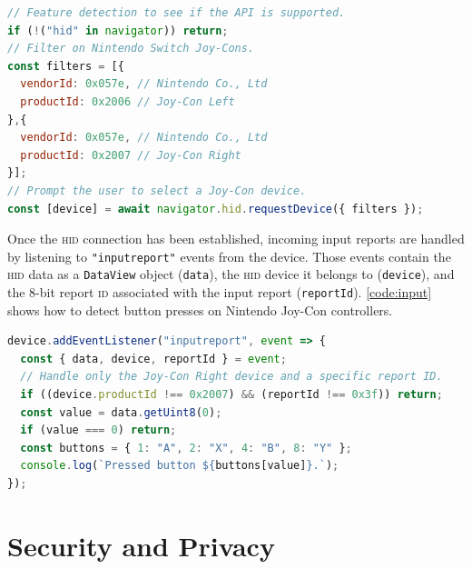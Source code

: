 \documentclass[sigconf]{acmart}
\begin{document}
\begin{lstlisting}[language=JavaScript, style=ES6, caption={Connecting to Nintendo Joy-Con controllers}, label={code:connect}]
// Feature detection to see if the API is supported.
if (!("hid" in navigator)) return;
// Filter on Nintendo Switch Joy-Cons.
const filters = [{
  vendorId: 0x057e, // Nintendo Co., Ltd
  productId: 0x2006 // Joy-Con Left
},{
  vendorId: 0x057e, // Nintendo Co., Ltd
  productId: 0x2007 // Joy-Con Right
}];
// Prompt the user to select a Joy-Con device.
const [device] = await navigator.hid.requestDevice({ filters });
\end{lstlisting}

Once the \textsc{hid} connection has been established, incoming input reports are handled
by listening to \texttt{"inputreport"} events from the device.
Those events contain the \textsc{hid} data as a
\texttt{DataView} object (\texttt{data}),
the \textsc{hid} device it belongs to (\texttt{device}),
and the 8-bit report \textsc{id} associated with the input report (\texttt{reportId}).
\autoref{code:input} shows how to detect button presses on Nintendo Joy-Con controllers.

\begin{lstlisting}[language=JavaScript, style=ES6, caption={Listening to Joy-Con controller input reports}, label={code:input}]
device.addEventListener("inputreport", event => {
  const { data, device, reportId } = event;
  // Handle only the Joy-Con Right device and a specific report ID.
  if ((device.productId !== 0x2007) && (reportId !== 0x3f)) return;
  const value = data.getUint8(0);
  if (value === 0) return;
  const buttons = { 1: "A", 2: "X", 4: "B", 8: "Y" };
  console.log(`Pressed button ${buttons[value]}.`);
});
\end{lstlisting}

\section{Security and Privacy}
\end{document}
